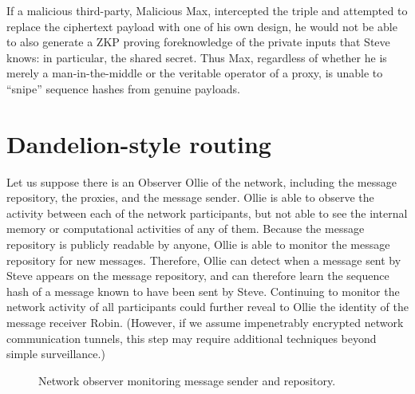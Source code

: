 If a malicious third-party, Malicious Max, intercepted the triple and attempted to replace the ciphertext payload with one of his own design, he would not be able to also generate a ZKP proving foreknowledge of the private inputs that Steve knows: in particular, the shared secret. Thus Max, regardless of whether he is merely a man-in-the-middle or the veritable operator of a proxy, is unable to ``snipe'' sequence hashes from genuine payloads.

\section{Dandelion-style routing}\label{dandelion-style-routing}

Let us suppose there is an Observer Ollie of the network, including the message repository, the proxies, and the message sender. Ollie is able to observe the activity between each of the network participants, but not able to see the internal memory or computational activities of any of them. Because the message repository is publicly readable by anyone, Ollie is able to monitor the message repository for new messages. Therefore, Ollie can detect when a message sent by Steve appears on the message repository, and can therefore learn the sequence hash of a message known to have been sent by Steve. Continuing to monitor the network activity of all participants could further reveal to Ollie the identity of the message receiver Robin. (However, if we assume impenetrably encrypted network communication tunnels, this step may require additional techniques beyond simple surveillance.)

\begin{figure}[h]
    \centering
    \caption{Network observer monitoring message sender and repository.}
    \label{fig:observer}
\end{figure}

